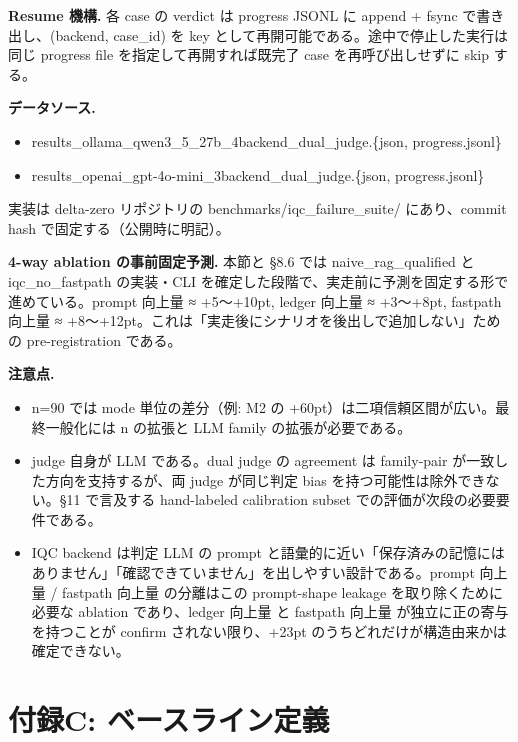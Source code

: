 \documentclass[12pt,a4paper]{article}
\begin{document}
\textbf{Resume 機構.} 各 case の verdict は progress JSONL に append + fsync で書き出し、(backend, case\_id) を key として再開可能である。途中で停止した実行は同じ progress file を指定して再開すれば既完了 case を再呼び出しせずに skip する。

\textbf{データソース.}

\begin{itemize}
\tightlist
\item
  results\_ollama\_qwen3\_5\_27b\_4backend\_dual\_judge.\{json, progress.jsonl\}
\item
  results\_openai\_gpt-4o-mini\_3backend\_dual\_judge.\{json, progress.jsonl\}
\end{itemize}

実装は delta-zero リポジトリの benchmarks/iqc\_failure\_suite/ にあり、commit hash で固定する（公開時に明記）。

\textbf{4-way ablation の事前固定予測.} 本節と \S8.6 では naive\_rag\_qualified と iqc\_no\_fastpath の実装・CLI を確定した段階で、実走前に予測を固定する形で進めている。prompt 向上量 ≈ +5〜+10pt, ledger 向上量 ≈ +3〜+8pt, fastpath 向上量 ≈ +8〜+12pt。これは「実走後にシナリオを後出しで追加しない」ための pre-registration である。

\textbf{注意点.}

\begin{itemize}
\tightlist
\item
  n=90 では mode 単位の差分（例: M2 の +60pt）は二項信頼区間が広い。最終一般化には n の拡張と LLM family の拡張が必要である。
\item
  judge 自身が LLM である。dual judge の agreement は family-pair が一致した方向を支持するが、両 judge が同じ判定 bias を持つ可能性は除外できない。\S11 で言及する hand-labeled calibration subset での評価が次段の必要要件である。
\item
  IQC backend は判定 LLM の prompt と語彙的に近い「保存済みの記憶にはありません」「確認できていません」を出しやすい設計である。prompt 向上量 / fastpath 向上量 の分離はこの prompt-shape leakage を取り除くために必要な ablation であり、ledger 向上量 と fastpath 向上量 が独立に正の寄与を持つことが confirm されない限り、+23pt のうちどれだけが構造由来かは確定できない。
\end{itemize}

\section{付録C: ベースライン定義}\label{ux4ed8ux9332c-ux30d9ux30fcux30b9ux30e9ux30a4ux30f3ux5b9aux7fa9}
\end{document}
